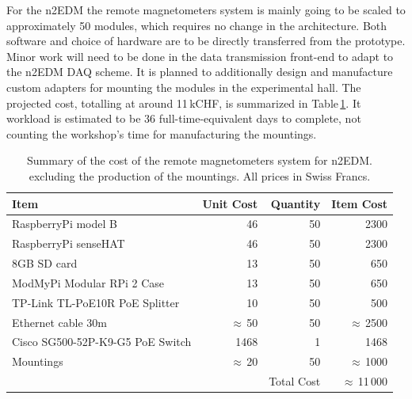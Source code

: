 For the n2EDM the remote magnetometers system is mainly going to be scaled to approximately 50 modules, which requires no change in the architecture. Both software and choice of hardware are to be directly transferred from the prototype. Minor work will need to be done in the data transmission front-end to adapt to the n2EDM DAQ scheme. It is planned to additionally design and manufacture custom adapters for mounting the modules in the experimental hall. The projected cost, totalling at around 11$\,$kCHF, is summarized in Table\,\ref{tab:remote_magnetometers_cost}. It workload is estimated to be 36 full-time-equivalent days to complete, not counting the workshop's time for manufacturing the mountings.


\begin{table}
  \centering
  \begin{tabular}{lrrr}
    \toprule
    Item  & Unit Cost & Quantity & Item Cost \\
    \midrule
    RaspberryPi model B & 46 & 50 & 2300 \\
    RaspberryPi senseHAT & 46 & 50 & 2300 \\
    8GB SD card & 13 & 50 & 650 \\
    ModMyPi Modular RPi 2 Case & 13 & 50 & 650 \\
    TP-Link TL-PoE10R PoE Splitter & 10 & 50 & 500 \\
    Ethernet cable 30m & $\approx\,$50 & 50 & $\approx\,$2500 \\
    Cisco SG500-52P-K9-G5 PoE Switch & 1468 & 1 & 1468 \\
    Mountings & $\approx\,$20 & 50 & $\approx\,$1000 \\
    \cmidrule{3-4}
    & & Total Cost & $\approx\,$11\,000 \\
    \bottomrule
  \end{tabular}
  \caption{Summary of the cost of the remote magnetometers system for n2EDM. excluding the production of the mountings. All prices in Swiss Francs.}
  \label{tab:remote_magnetometers_cost}
\end{table}
